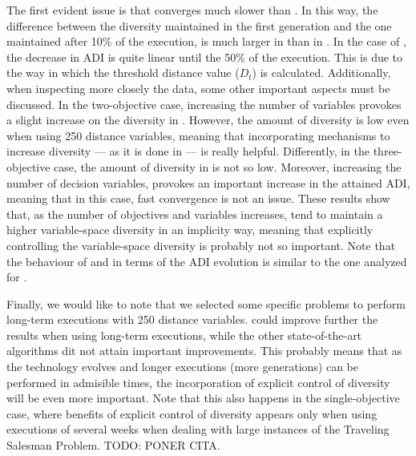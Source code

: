 %
The first evident issue is that \VSDMOEA{} converges much slower than \RMOEA{}.
%
In this way, the difference between the diversity maintained in the first generation and the one maintained after 10\% of the execution,
is much larger in \RMOEA{} than in \VSDMOEA{}.
%
In the case of \VSDMOEA{}, the decrease in ADI is quite linear until the 50\% of the execution.
%
This is due to the way in which the threshold distance value ($D_t$) is calculated.
%
Additionally, when inspecting more closely the data, some other important aspects must be discussed. 
%
In the two-objective case, increasing the number of variables provokes a slight increase on the diversity in \RMOEA{}.
%
However, the amount of diversity is low even when using 250 distance variables, meaning that incorporating mechanisms to increase diversity --- as it is done in \VSDMOEA{} ---
is really helpful.
%
Differently, in the three-objective case, the amount of diversity in \RMOEA{} is not so low.
%
Moreover, increasing the number of decision variables, provokes an important increase in the attained ADI, meaning that in this case,
fast convergence is not an issue.
%
These results show that, as the number of objectives and variables increases, \MOEAS{} tend to maintain a higher variable-space diversity
in an implicity way, meaning that explicitly controlling the variable-space diversity is probably not so important.
%
Note that the behaviour of \NSGAII{} and \MOEAD{} in terms of the ADI evolution is similar to the one analyzed for \RMOEA{}.

Finally, we would like to note that we selected some specific problems to perform long-term executions with 250 distance variables.
%
\VSDMOEA{} could improve further the results when using long-term executions, while the other state-of-the-art algorithms dit not attain
important improvements.
%
This probably means that as the technology evolves and longer executions (more generations) can be performed in admisible times,
the incorporation of explicit control of diversity will be even more important.
%
Note that this also happens in the single-objective case, where benefits of explicit control of diversity appears only when using executions of
several weeks when dealing with large instances of the Traveling Salesman Problem.
%
TODO: PONER CITA.




